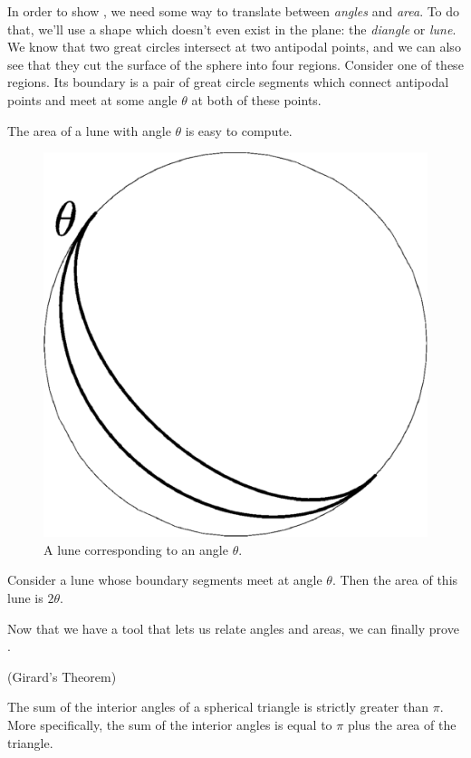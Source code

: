 In order to  show , we need some way to translate between \textit{angles} and \textit{area}.  To do that, we'll use a shape which doesn't even exist in the plane: the \textit{diangle} or \textit{lune}.    We know that two great circles intersect at two antipodal points, and we can also see that they cut the surface of the sphere into four regions.  Consider one of these regions.  Its boundary is a pair of great circle segments which connect antipodal points and meet at some angle $\theta$ at both of these points.   

The area of a lune with angle $\theta$ is easy to compute.


\begin{figure}[htb]
	\centering
	\includegraphics[width=.35\textwidth]{figs/lune.pdf}
	\caption{A lune corresponding to an angle $\theta$. }
	\label{fig:lune}
\end{figure}

\begin{claim}
	Consider a lune whose boundary segments meet at angle $\theta$.  Then the area of this lune is $2\theta$.
\end{claim}
Now that we have a tool that lets us relate angles and areas, we can finally prove .










\begin{lemma}(Girard's Theorem)\label{lem:sphtri}
	
	The sum of the interior angles of a spherical triangle is strictly greater than $\pi$.  More specifically, the sum of the interior angles is equal to $\pi$ plus the area of the triangle.
\end{lemma}

